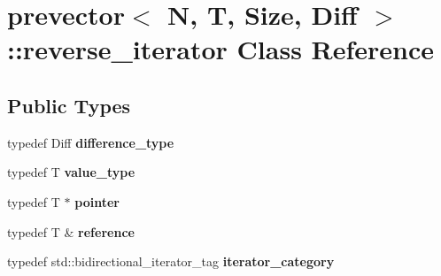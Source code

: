 \hypertarget{classprevector_1_1reverse__iterator}{}\section{prevector$<$ N, T, Size, Diff $>$\+::reverse\+\_\+iterator Class Reference}
\label{classprevector_1_1reverse__iterator}
\subsection*{Public Types}
\begin{DoxyCompactItemize}
\item 
\mbox{\label{classprevector_1_1reverse__iterator_a365f89bb315bdb54cbbfafbce8b29e0a}} 
typedef Diff {\bfseries difference\+\_\+type}
\item 
\mbox{\label{classprevector_1_1reverse__iterator_a3d18023700976ec30e7d6076285d3253}} 
typedef T {\bfseries value\+\_\+type}
\item 
\mbox{\label{classprevector_1_1reverse__iterator_affd9dcd9ef382da1f07f4194997f5a66}} 
typedef T $\ast$ {\bfseries pointer}
\item 
\mbox{\label{classprevector_1_1reverse__iterator_acc7b6fc472e53e0e33b42a089499b475}} 
typedef T \& {\bfseries reference}
\item 
\mbox{\label{classprevector_1_1reverse__iterator_a02a9858a2c1175b18e1ab1326775b8bc}} 
typedef std\+::bidirectional\+\_\+iterator\+\_\+tag {\bfseries iterator\+\_\+category}
\end{DoxyCompactItemize}
